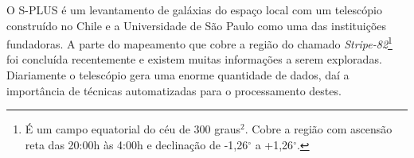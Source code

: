 O S-PLUS \cite{oliveira2019} é um levantamento de galáxias do espaço local com um telescópio construído no Chile e a Universidade de São Paulo como uma das instituições fundadoras. A parte do mapeamento que cobre a região do chamado \emph{Stripe-82}\footnote{É um campo equatorial do céu de 300 graus$^{2}$. Cobre a região com ascensão reta das 20:00h às 4:00h e declinação de -1,26$^{\circ}$ a +1,26$^{\circ}$.} foi concluída recentemente e existem muitas informações a serem exploradas. Diariamente o telescópio gera uma enorme quantidade de dados, daí a importância de técnicas automatizadas para o processamento destes.
